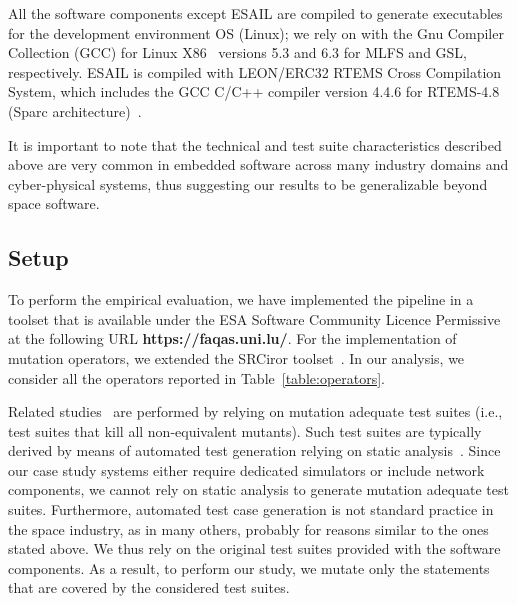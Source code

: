 All the software components except ESAIL are compiled to generate executables for the development environment OS (Linux); we rely on with the Gnu Compiler Collection (GCC)  for Linux X86~\cite{GCC} versions 5.3 and 6.3 for MLFS and GSL, respectively. ESAIL is compiled with 
LEON/ERC32 RTEMS Cross Compilation System, which includes the GCC C/C++ compiler version 4.4.6 for  RTEMS-4.8 (Sparc architecture)~\cite{RTEMS}.

It is important to note that the technical and test suite characteristics described above are very common in embedded software across many industry domains and cyber-physical systems, thus suggesting our results to be generalizable beyond space software. 







\subsection{Setup}
\label{experimnt:setup}

To perform the empirical evaluation, we have implemented the \APPR pipeline in a toolset that is available under the ESA Software Community Licence Permissive~\cite{ESAlicence} at the following URL \textbf{https://faqas.uni.lu/}.
For the implementation of mutation operators, we extended the SRCiror toolset~\cite{hariri2018srciror}.
In our analysis, we consider all the operators reported in Table~\ref{table:operators}.

Related studies~\cite{zhang2010operator,zhang2013operator} are performed by relying on mutation adequate test suites (i.e., test suites that kill all non-equivalent mutants). 
Such test suites are typically derived by means of automated test generation relying on static analysis~\cite{papadakis2012mutation}.
Since our case study systems either require dedicated simulators or include network components, we cannot rely on static analysis to generate mutation adequate test suites. 
Furthermore, automated test case generation is not standard practice in the space industry, as in many others, probably for reasons similar to the ones stated above.
We thus rely on the original test suites provided with the software components. As a result, to perform our study, we mutate only the statements that are covered by the considered test suites.

